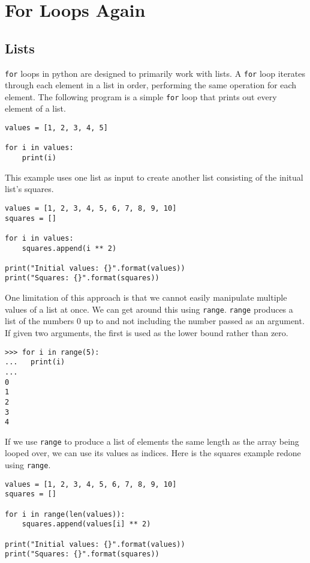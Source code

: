 \documentclass[11pt]{cselabheader}
\begin{document}
\section{For Loops Again}
\subsection{Lists}
\lstinline{for} loops in python are designed to primarily work with lists. A \lstinline{for} loop iterates through each element in a list in order, performing the same operation for each element. The following program is a simple \lstinline{for} loop that prints out every element of a list.

\begin{lstlisting}[style=python]
values = [1, 2, 3, 4, 5]

for i in values:
    print(i)
\end{lstlisting}

This example uses one list as input to create another list consisting of the initual list's squares.

\begin{lstlisting}[style=python]
values = [1, 2, 3, 4, 5, 6, 7, 8, 9, 10]
squares = []

for i in values:
    squares.append(i ** 2)

print("Initial values: {}".format(values))
print("Squares: {}".format(squares))
\end{lstlisting}

One limitation of this approach is that we cannot easily manipulate multiple values of a list at once. We can get around this using \lstinline{range}. \lstinline{range} produces a list of the numbers 0 up to and not including the number passed as an argument. If given two arguments, the first is used as the lower bound rather than zero.

\begin{lstlisting}[style=ipython]
>>> for i in range(5):
...   print(i)
... 
0
1
2
3
4
\end{lstlisting}

If we use \lstinline{range} to produce a list of elements the same length as the array being looped over, we can use its values as indices. Here is the squares example redone using \lstinline{range}.

\begin{lstlisting}[style=python]
values = [1, 2, 3, 4, 5, 6, 7, 8, 9, 10]
squares = []

for i in range(len(values)):
    squares.append(values[i] ** 2)

print("Initial values: {}".format(values))
print("Squares: {}".format(squares))
\end{lstlisting}
\end{document}

